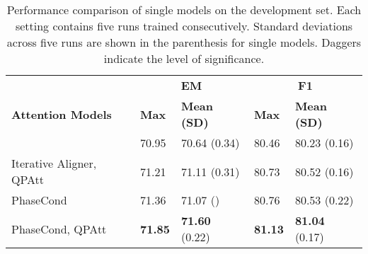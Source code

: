 \documentclass{article} \usepackage{arxiv, times}
\begin{document}
\begin{table}[t] 
\caption{Performance comparison of single models on the development set. Each setting contains five runs trained consecutively. Standard deviations across five runs are shown in the parenthesis for single models. Daggers indicate the level of significance.}\label{tab:single-model-compare}
 \begin{center}
 \begin{tabular}{lllll}
 \hline
\multirow{3}{*}{\bf Attention Models}& \multicolumn{2}{c}{\bf EM} & \multicolumn{2}{c}{\bf F1}\\
 & \bf Max & \bf Mean (SD) & \bf Max & \bf Mean (SD) \\
 \hline
 Iterative Aligner & 70.95 & 70.64 (0.34) & 80.46 & 80.23 (0.16)  \\
 Iterative Aligner, QPAtt & 71.21& 71.11 (0.31) & 80.73 & 80.52 (0.16) \\\hline
 PhaseCond & 71.36 & 71.07 () & 80.76 & 80.53 (0.22)  \\
 PhaseCond, QPAtt & \textbf{71.85} & \textbf{71.60} (0.22)  & \textbf{81.13} & \textbf{81.04} (0.17)  \\
 \hline
 \end{tabular}
 \end{center}
 \end{table}
\end{document}
